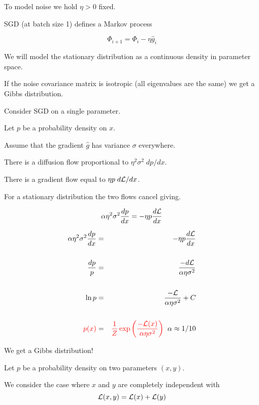 {\vfill
To model noise we hold $\eta > 0 $ fixed.


SGD (at batch size 1) defines a Markov process

$$\Phi_{i+1} = \Phi_i - \eta \hat{g}_i$$

\vfill
We will model the stationary distribution as a continuous density in parameter space.

\vfill
If the noise covariance matrix is isotropic (all eigenvalues are the same) we get a Gibbs distribution.



Consider SGD on a single parameter.

\vfill
Let $p$ be a probability density on $x$.

\vfill
Assume that the gradient $\hat{g}$ has variance $\sigma$ everywhere.

\vfill
There is a diffusion flow proportional to $\eta^2\sigma^2\;dp/dx$.

\vfill
There is a gradient flow equal to $\eta p \;d {\cal L}/dx$.

\vfill
For a stationary distribution the two flows cancel giving.

\vfill
{\color{red} $$\alpha \eta^2 \sigma^2 \frac{dp}{dx} = - \eta p\frac{d{\cal L}}{dx}$$}



\vspace{-2ex}
\begin{eqnarray*}
\alpha \eta^2 \sigma^2 \frac{dp}{dx} & = & - \eta p\frac{d{\cal L}}{dx} \\
\\
\frac{dp}{p} & = & \frac{-d{\cal L}}{\alpha\eta\sigma^2} \\
\\
\ln p & = & \frac{-{\cal L}}{\alpha \eta \sigma^2} + C \\
\\
{\color{red} p(x)} & = & {\color{red} \frac{1}{Z}\exp\left(\frac{-{\cal L}(x)}{\alpha \eta \sigma^2}\right)}\;\;\alpha \approx 1/10
\end{eqnarray*}

\vfill
We get a Gibbs distribution!


Let $p$ be a probability density on two parameters $(x,y)$.

\vfill
We consider the case where $x$ and $y$ are completely independent with
$${\cal L}(x,y) = {\cal L}(x) + {\cal L}(y)$$

}

